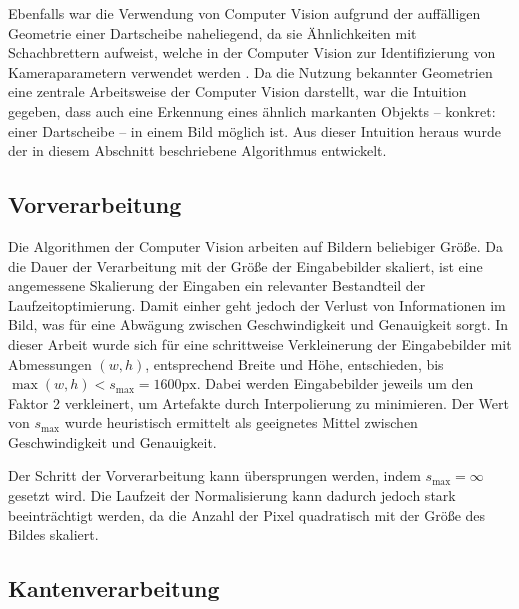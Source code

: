 Ebenfalls war die Verwendung von Computer Vision aufgrund der auffälligen Geometrie einer Dartscheibe naheliegend, da sie Ähnlichkeiten mit Schachbrettern aufweist, welche in der Computer Vision zur Identifizierung von Kameraparametern verwendet werden \cite{cv_general}. Da die Nutzung bekannter Geometrien eine zentrale Arbeitsweise der Computer Vision darstellt, war die Intuition gegeben, dass auch eine Erkennung eines ähnlich markanten Objekts -- konkret: einer Dartscheibe -- in einem Bild möglich ist. Aus dieser Intuition heraus wurde der in diesem Abschnitt beschriebene Algorithmus entwickelt.


\subsection{Vorverarbeitung}
\label{sec:vorverarbeitung}

Die Algorithmen der Computer Vision arbeiten auf Bildern beliebiger Größe. Da die Dauer der Verarbeitung mit der Größe der Eingabebilder skaliert, ist eine angemessene Skalierung der Eingaben ein relevanter Bestandteil der Laufzeitoptimierung. Damit einher geht jedoch der Verlust von Informationen im Bild, was für eine Abwägung zwischen Geschwindigkeit und Genauigkeit sorgt. In dieser Arbeit wurde sich für eine schrittweise Verkleinerung der Eingabebilder mit Abmessungen $(w, h)$, entsprechend Breite und Höhe, entschieden, bis $\max (w, h) < s_\text{max} = 1600\text{px}$. Dabei werden Eingabebilder jeweils um den Faktor 2 verkleinert, um Artefakte durch Interpolierung zu minimieren. Der Wert von $s_\text{max}$ wurde heuristisch ermittelt als geeignetes Mittel zwischen Geschwindigkeit und Genauigkeit.

Der Schritt der Vorverarbeitung kann übersprungen werden, indem $s_\text{max} = \infty$ gesetzt wird. Die Laufzeit der Normalisierung kann dadurch jedoch stark beeinträchtigt werden, da die Anzahl der Pixel quadratisch mit der Größe des Bildes skaliert.


\subsection{Kantenverarbeitung}
\label{sec:kanten}

